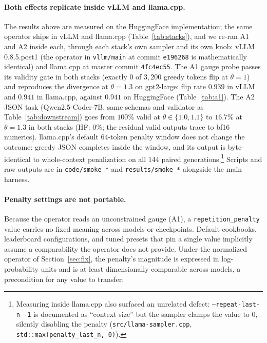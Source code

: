 \documentclass[11pt]{article}
\newcommand{\thp}{\theta}
\newcommand{\code}[1]{\texttt{#1}}
\begin{document}
\paragraph{Both effects replicate inside vLLM and llama.cpp.} The results above are measured on
the HuggingFace implementation; the same operator ships in vLLM and llama.cpp
(Table~\ref{tab:stacks}), and we re-ran A1 and A2 inside each, through each stack's own sampler
and its own knob: vLLM 0.8.5.post1 (the operator in \code{vllm/main} at commit \code{e196268} is
mathematically identical) and llama.cpp at master commit \code{4fc4ec55}. The A1 gauge probe
passes its validity gate in both stacks (exactly $0$ of $3{,}200$ greedy tokens flip at
$\thp=1$) and reproduces the divergence at $\thp=1.3$ on gpt2-large: flip rate $0.939$ in vLLM
and $0.941$ in llama.cpp, against $0.941$ on HuggingFace (Table~\ref{tab:a1}). The A2 JSON task
(Qwen2.5-Coder-7B, same schemas and validator as Table~\ref{tab:downstream}) goes from $100\%$
valid at $\thp\in\{1.0,1.1\}$ to $16.7\%$ at $\thp=1.3$ in both stacks (HF: $0\%$; the residual
valid outputs trace to bf16 numerics). llama.cpp's default 64-token penalty window does not
change the outcome: greedy JSON completes inside the window, and its output is byte-identical
to whole-context penalization on all 144 paired generations.\footnote{Measuring inside
llama.cpp also surfaced an unrelated defect: \code{--repeat-last-n -1} is documented as
``context size'' but the sampler clamps the value to $0$, silently disabling the penalty
(\code{src/llama-sampler.cpp}, \code{std::max(penalty\_last\_n, 0)}).} Scripts and raw outputs
are in \code{code/smoke\_*} and \code{results/smoke\_*} alongside the main harness.

\paragraph{Penalty settings are not portable.} Because the operator reads an unconstrained
gauge (A1), a \code{repetition\_penalty} value carries no fixed meaning across models or
checkpoints. Default cookbooks, leaderboard configurations, and tuned presets that pin a
single value implicitly assume a comparability the operator does not provide. Under the
normalized operator of Section~\ref{sec:fix}, the penalty's magnitude is expressed in
log-probability units and is at least dimensionally comparable across models, a
precondition for any value to transfer.
\end{document}
